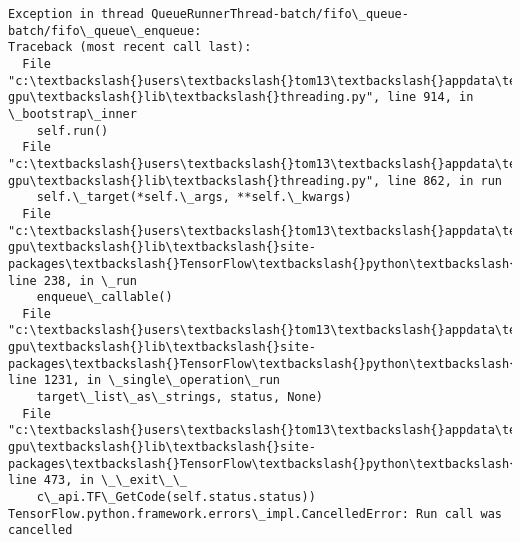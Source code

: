 \documentclass[11pt]{article}
\begin{document}
\begin{Verbatim}[commandchars=\\\{\}]
Exception in thread QueueRunnerThread-batch/fifo\_queue-batch/fifo\_queue\_enqueue:
Traceback (most recent call last):
  File "c:\textbackslash{}users\textbackslash{}tom13\textbackslash{}appdata\textbackslash{}local\textbackslash{}conda\textbackslash{}conda\textbackslash{}envs\textbackslash{}TensorFlow-gpu\textbackslash{}lib\textbackslash{}threading.py", line 914, in \_bootstrap\_inner
    self.run()
  File "c:\textbackslash{}users\textbackslash{}tom13\textbackslash{}appdata\textbackslash{}local\textbackslash{}conda\textbackslash{}conda\textbackslash{}envs\textbackslash{}TensorFlow-gpu\textbackslash{}lib\textbackslash{}threading.py", line 862, in run
    self.\_target(*self.\_args, **self.\_kwargs)
  File "c:\textbackslash{}users\textbackslash{}tom13\textbackslash{}appdata\textbackslash{}local\textbackslash{}conda\textbackslash{}conda\textbackslash{}envs\textbackslash{}TensorFlow-gpu\textbackslash{}lib\textbackslash{}site-packages\textbackslash{}TensorFlow\textbackslash{}python\textbackslash{}training\textbackslash{}queue\_runner\_impl.py", line 238, in \_run
    enqueue\_callable()
  File "c:\textbackslash{}users\textbackslash{}tom13\textbackslash{}appdata\textbackslash{}local\textbackslash{}conda\textbackslash{}conda\textbackslash{}envs\textbackslash{}TensorFlow-gpu\textbackslash{}lib\textbackslash{}site-packages\textbackslash{}TensorFlow\textbackslash{}python\textbackslash{}client\textbackslash{}session.py", line 1231, in \_single\_operation\_run
    target\_list\_as\_strings, status, None)
  File "c:\textbackslash{}users\textbackslash{}tom13\textbackslash{}appdata\textbackslash{}local\textbackslash{}conda\textbackslash{}conda\textbackslash{}envs\textbackslash{}TensorFlow-gpu\textbackslash{}lib\textbackslash{}site-packages\textbackslash{}TensorFlow\textbackslash{}python\textbackslash{}framework\textbackslash{}errors\_impl.py", line 473, in \_\_exit\_\_
    c\_api.TF\_GetCode(self.status.status))
TensorFlow.python.framework.errors\_impl.CancelledError: Run call was cancelled


\end{Verbatim}
\end{document}
